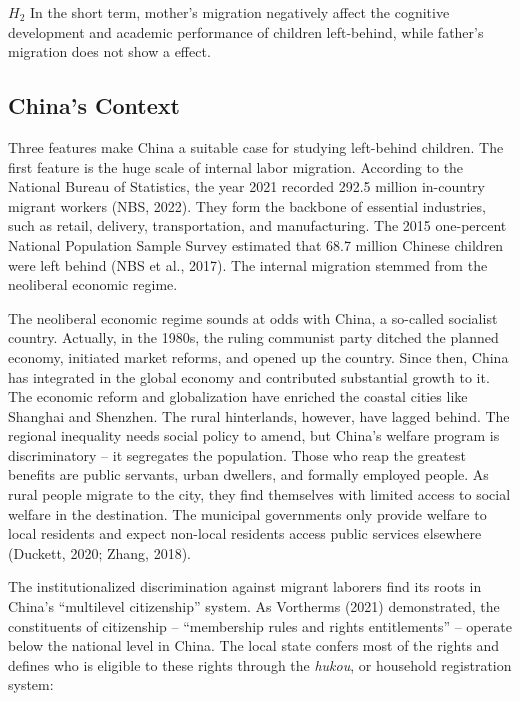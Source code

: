 \documentclass[
  man,floatsintext]{apa7}
\begin{document}
\(H_2\) In the short term, mother's migration negatively affect the cognitive development and academic performance of children left-behind, while father's migration does not show a effect.

\hypertarget{chinas-context}{%
\subsection{China's Context}\label{chinas-context}}

Three features make China a suitable case for studying left-behind children. The first feature is the huge scale of internal labor migration. According to the National Bureau of Statistics, the year 2021 recorded 292.5 million in-country migrant workers (NBS, 2022). They form the backbone of essential industries, such as retail, delivery, transportation, and manufacturing. The 2015 one-percent National Population Sample Survey estimated that 68.7 million Chinese children were left behind (NBS et al., 2017). The internal migration stemmed from the neoliberal economic regime.

The neoliberal economic regime sounds at odds with China, a so-called socialist country. Actually, in the 1980s, the ruling communist party ditched the planned economy, initiated market reforms, and opened up the country. Since then, China has integrated in the global economy and contributed substantial growth to it. The economic reform and globalization have enriched the coastal cities like Shanghai and Shenzhen. The rural hinterlands, however, have lagged behind. The regional inequality needs social policy to amend, but China's welfare program is discriminatory -- it segregates the population. Those who reap the greatest benefits are public servants, urban dwellers, and formally employed people. As rural people migrate to the city, they find themselves with limited access to social welfare in the destination. The municipal governments only provide welfare to local residents and expect non-local residents access public services elsewhere (Duckett, 2020; Zhang, 2018).

The institutionalized discrimination against migrant laborers find its roots in China's ``multilevel citizenship'' system. As Vortherms (2021) demonstrated, the constituents of citizenship -- ``membership rules and rights entitlements'' -- operate below the national level in China. The local state confers most of the rights and defines who is eligible to these rights through the \emph{hukou}, or household registration system:
\end{document}
